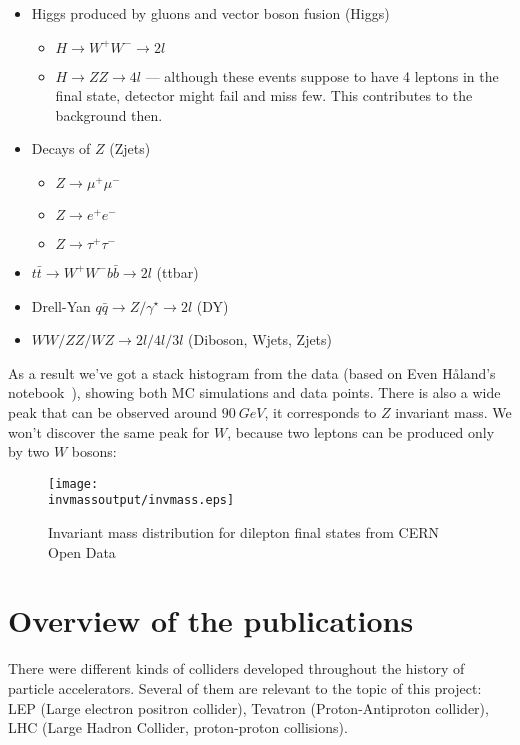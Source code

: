 \documentclass{article}
\newcommand{\invmassoutput}{../invmass/output}
\begin{document}
\begin{itemize}
    \item Higgs produced by gluons and vector boson fusion (Higgs)
    \begin{itemize}
        \item $H \rightarrow W^{+}W^{-} \rightarrow 2l$
        \item $H \rightarrow ZZ \rightarrow 4l$ --- although these events suppose to have 4 leptons in the final state, detector might fail and miss few. This contributes to the background then.
\end{itemize}
    \item Decays of $Z$ (Zjets)
    \begin{itemize}
        \item $Z \rightarrow \mu^{+} \mu^{-}$
        \item $Z \rightarrow e^{+} e^{-}$
        \item $Z \rightarrow \tau^{+} \tau^{-}$
    \end{itemize}
    \item $t \bar{t} \rightarrow W^{+} W^{-} b \bar{b} \rightarrow 2l$ (ttbar)
    \item Drell-Yan $q \bar{q} \rightarrow Z / \gamma^{\star} \rightarrow 2l$ (DY)
    \item $WW/ZZ/WZ \rightarrow 2l/4l/3l$ (Diboson, Wjets, Zjets)
\end{itemize}

As a result we've got a stack histogram from the data (based on Even Håland's notebook~\cite{url:even-dilepton}), showing both MC simulations and data points. There is also a wide peak that can be observed around $90~GeV$, it corresponds to $Z$ invariant mass. We won't discover the same peak for $W$, because two leptons can be produced only by two $W$ bosons:

\begin{figure}[H]
    \centering
    \texttt{[image: \\invmassoutput/invmass.eps]}
    \caption{Invariant mass distribution for dilepton final states from CERN Open Data}%
    \label{fig:invmass-open-data}
\end{figure}

\section{Overview of the publications}
There were different kinds of colliders developed throughout the history of particle accelerators. Several of them are relevant to the topic of this project: LEP (Large electron positron collider), Tevatron (Proton-Antiproton collider), LHC (Large Hadron Collider, proton-proton collisions).
\end{document}
